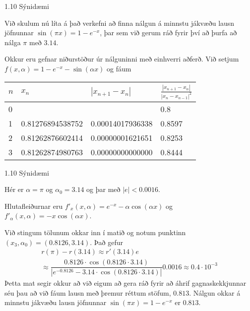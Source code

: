 %
\begin{frame}{1.10 Sýnidæmi} 

Við skulum nú líta á það verkefni að finna nálgun á minnstu jákvæðu 
lausn jöfnunnar $\sin(\pi x)=1-e^{-x}$, þar sem við gerum ráð fyrir 
því að þurfa að nálga $\pi$ með $3.14$.

\pause

Okkur eru gefnar niðurstöður úr nálguninni með einhverri aðferð. 
Við setjum $f(x,\alpha)=1-e^{-x}-\sin(\alpha x)$ og fáum
\begin{center}
\begin{tabular}{l|l|l|l|}
$n$  & $x_n$ &$|x_{n+1}-x_n|$ &  $\frac{|x_{n+1}-x_n|}{|x_n-x_{n-1}|^2}$\\ \hline
   0&  & & 0.8\\
   1&  0.81276894538752 &  0.00014017936338 &  0.8597\\
   2&  0.81262876602414 &  0.00000001621651 &  0.8253\\
   3&   0.81262874980763 &  0.00000000000000 &  0.8444\\
\end{tabular}
\end{center}
\end{frame}
%
%
\begin{frame}{1.10 Sýnidæmi} 

Hér er $\alpha=\pi$ og $\alpha_0=3.14$ og þar með $|e|<0.0016$. 

\pause

Hlutafleiðurnar eru $f'_x(x,\alpha)=e^{-x}-\alpha\cos(\alpha x)$ og
$f'_\alpha(x,\alpha)=-x\cos(\alpha x)$. 

\pause

Við stingum tölunum okkar inn í matið og notum punktinn $(x_3,\alpha_0)=(0.8126,3.14)$. Það gefur 
\begin{multline*}
    r(\pi)-r(3.14)\approx r'(3.14)e\\
    \approx
    \dfrac{0.8126\cdot \cos(0.8126\cdot 3.14)}{|e^{-0.8126}-3.14
    \cdot \cos(0.8126 \cdot 3.14)|}
    0.0016\approx 0.4\cdot 10^{-3}
\end{multline*}\pause
Þetta mat segir okkur að við eigum að gera ráð fyrir að áhrif
gagnaskekkjunnar séu þau að við fáum lausn með þremur réttum stöfum,
$0.813$. Nálgun okkar á minnstu jákvæðu lausn jöfnunnar $\sin(\pi
x)=1-e^{-x}$ er $0.813$. 

\end{frame}
%


